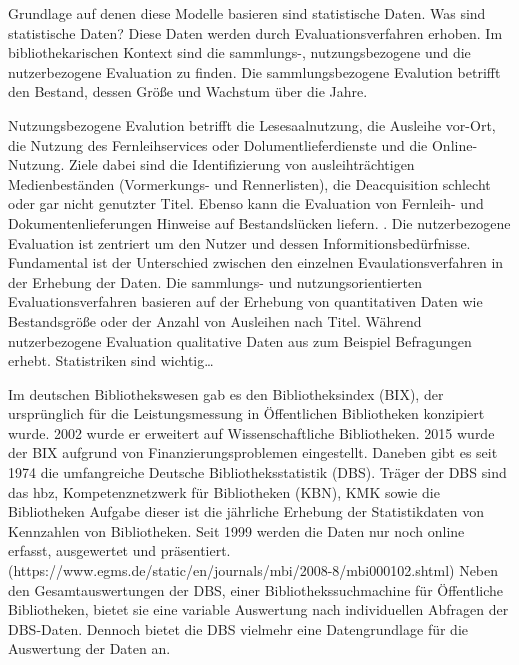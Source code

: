 Grundlage auf denen diese Modelle basieren sind statistische Daten. Was sind statistische Daten? Diese Daten werden durch Evaluationsverfahren erhoben. 
Im bibliothekarischen Kontext sind die sammlungs-, nutzungsbezogene und die nutzerbezogene Evaluation zu finden.  
Die sammlungsbezogene Evalution betrifft den Bestand, dessen Größe und Wachstum über die Jahre.

Nutzungsbezogene Evalution betrifft die Lesesaalnutzung, die Ausleihe vor-Ort, die Nutzung des Fernleihservices oder Dolumentlieferdienste 
und die Online-Nutzung. Ziele dabei sind die Identifizierung von ausleihträchtigen Medienbeständen (Vormerkungs- und Rennerlisten), 
die Deacquisition schlecht oder gar nicht genutzter Titel. Ebenso kann die Evaluation von Fernleih- und Dokumentenlieferungen Hinweise auf Bestandslücken liefern. 
\cite[255 ff.]{johannsen_jochen_bestands-_2015}. Die nutzerbezogene Evaluation ist zentriert um den Nutzer und dessen Informitionsbedürfnisse.
Fundamental ist der Unterschied zwischen den einzelnen Evaulationsverfahren in der Erhebung der Daten. 
Die sammlungs- und nutzungsorientierten Evaluationsverfahren basieren auf der Erhebung von quantitativen Daten wie Bestandsgröße oder der Anzahl von Ausleihen nach Titel. 
Während nutzerbezogene Evaluation qualitative Daten aus zum Beispiel Befragungen erhebt. \cite[461 ff.]{blake_data_2004}
Statistriken sind wichtig…

Im deutschen Bibliothekswesen gab es den Bibliotheksindex (BIX), der ursprünglich 
für die Leistungsmessung in Öffentlichen Bibliotheken konzipiert wurde. 
2002 wurde er erweitert auf Wissenschaftliche Bibliotheken. 2015 wurde der BIX aufgrund von Finanzierungsproblemen eingestellt. 
Daneben gibt es seit 1974 die umfangreiche Deutsche Bibliotheksstatistik (DBS). 
Träger der DBS sind das hbz, Kompetenznetzwerk für Bibliotheken (KBN), KMK sowie die Bibliotheken
Aufgabe dieser ist die jährliche Erhebung der Statistikdaten von Kennzahlen von Bibliotheken. 
Seit 1999 werden die Daten nur noch online erfasst, ausgewertet und präsentiert. 
(https://www.egms.de/static/en/journals/mbi/2008-8/mbi000102.shtml)
Neben den Gesamtauswertungen der DBS, einer Bibliothekssuchmachine für Öffentliche Bibliotheken, 
bietet sie eine variable Auswertung nach individuellen Abfragen der DBS-Daten. 
Dennoch bietet die DBS vielmehr eine Datengrundlage für die Auswertung der Daten an.



